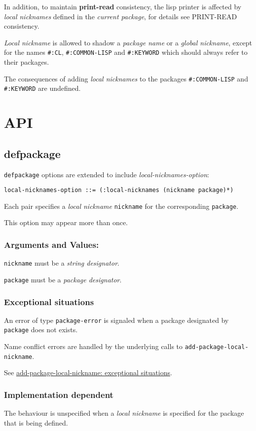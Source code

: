\documentclass[11pt]{article}
\begin{document}
In addition, to maintain \textbf{print-read} consistency, the lisp printer is
affected by \emph{local nicknames} defined in the \emph{current package}, for details
see PRINT-READ consistency.

\emph{Local nickname} is allowed to shadow a \emph{package name} or a \emph{global
nickname}, except for the names \texttt{\#:CL}, \texttt{\#:COMMON-LISP} and \texttt{\#:KEYWORD}
which should always refer to their packages.

The consequences of adding \emph{local nicknames} to the packages
\texttt{\#:COMMON-LISP} and \texttt{\#:KEYWORD} are undefined.
\section{API}
\label{sec:org613db5c}
\subsection{defpackage}
\label{sec:org393c69d}
\texttt{defpackage} options are extended to include \emph{local-nicknames-option}:
\begin{verbatim}
local-nicknames-option ::= (:local-nicknames (nickname package)*)
\end{verbatim}


Each pair specifies a \emph{local nickname} \texttt{nickname} for the corresponding
\texttt{package}.

This option may appear more than once.
\subsubsection{Arguments and Values:}
\label{sec:org5a306c1}
\texttt{nickname} must be a \emph{string designator}.

\texttt{package} must be a \emph{package designator}.
\subsubsection{Exceptional situations}
\label{sec:orgc40c1e8}
An error of type \texttt{package-error} is signaled when a package designated by
\texttt{package} does not exists.

Name conflict errors are handled by the underlying calls to
\texttt{add-package-local-nickname}.

See \hyperref[sec:org05d592d]{add-package-local-nickname: exceptional situations}.
\subsubsection{Implementation dependent}
\label{sec:org7ca6297}
The behaviour is unspecified when a \emph{local nickname} is specified for the
package that is being defined.
\end{document}
